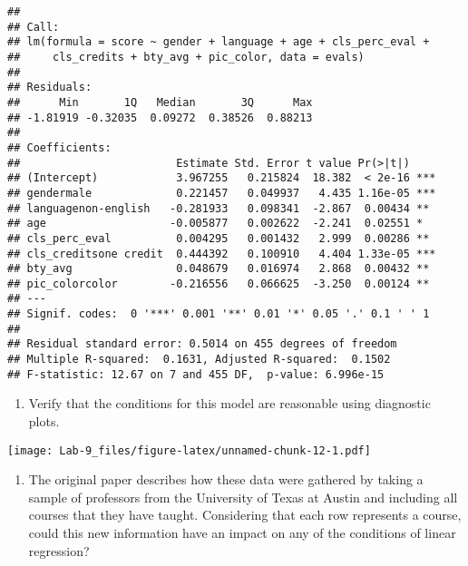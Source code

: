\documentclass[
]{article}
\newenvironment{Shaded}{\begin{snugshade}}{\end{snugshade}}
\newcommand{\FunctionTok}[1]{\textcolor[rgb]{0.00,0.00,0.00}{#1}}
\newcommand{\NormalTok}[1]{#1}
\newcommand{\SpecialCharTok}[1]{\textcolor[rgb]{0.00,0.00,0.00}{#1}}
\providecommand{\tightlist}{%
  \setlength{\itemsep}{0pt}\setlength{\parskip}{0pt}}
\begin{document}
\begin{verbatim}
## 
## Call:
## lm(formula = score ~ gender + language + age + cls_perc_eval + 
##     cls_credits + bty_avg + pic_color, data = evals)
## 
## Residuals:
##      Min       1Q   Median       3Q      Max 
## -1.81919 -0.32035  0.09272  0.38526  0.88213 
## 
## Coefficients:
##                        Estimate Std. Error t value Pr(>|t|)    
## (Intercept)            3.967255   0.215824  18.382  < 2e-16 ***
## gendermale             0.221457   0.049937   4.435 1.16e-05 ***
## languagenon-english   -0.281933   0.098341  -2.867  0.00434 ** 
## age                   -0.005877   0.002622  -2.241  0.02551 *  
## cls_perc_eval          0.004295   0.001432   2.999  0.00286 ** 
## cls_creditsone credit  0.444392   0.100910   4.404 1.33e-05 ***
## bty_avg                0.048679   0.016974   2.868  0.00432 ** 
## pic_colorcolor        -0.216556   0.066625  -3.250  0.00124 ** 
## ---
## Signif. codes:  0 '***' 0.001 '**' 0.01 '*' 0.05 '.' 0.1 ' ' 1
## 
## Residual standard error: 0.5014 on 455 degrees of freedom
## Multiple R-squared:  0.1631, Adjusted R-squared:  0.1502 
## F-statistic: 12.67 on 7 and 455 DF,  p-value: 6.996e-15
\end{verbatim}

\begin{enumerate}
\def\labelenumi{\arabic{enumi}.}
\setcounter{enumi}{15}
\tightlist
\item
  Verify that the conditions for this model are reasonable using
  diagnostic plots.
\end{enumerate}

\begin{Shaded}
\end{Shaded}

\texttt{[image: Lab-9\_files/figure-latex/unnamed-chunk-12-1.pdf]}

\begin{enumerate}
\def\labelenumi{\arabic{enumi}.}
\setcounter{enumi}{16}
\tightlist
\item
  The original paper describes how these data were gathered by taking a
  sample of professors from the University of Texas at Austin and
  including all courses that they have taught. Considering that each row
  represents a course, could this new information have an impact on any
  of the conditions of linear regression?
\end{enumerate}
\end{document}
